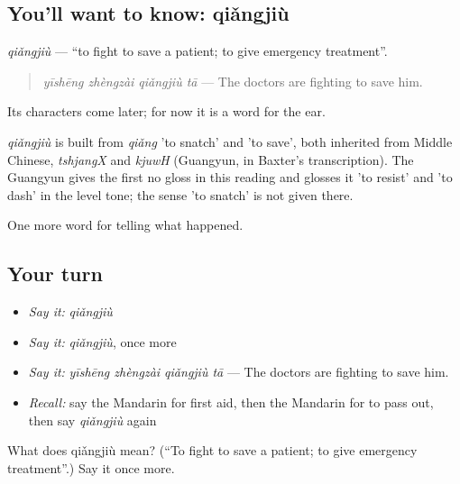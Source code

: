 \subsection*{You'll want to know: qiǎngjiù}
\emph{qiǎngjiù} — \textquotedblleft{}to fight to save a patient; to give emergency treatment\textquotedblright{}.

\begin{quote}
\emph{yīshēng zhèngzài qiǎngjiù tā} — The doctors are fighting to save him.
\end{quote}

Its characters come later; for now it is a word for the ear.

\begin{cousinweb}
\emph{qiǎngjiù} is built from \emph{qiǎng} 'to snatch' and  'to save', both inherited from Middle Chinese, \emph{tshjangX} and \emph{kjuwH} (Guangyun, in Baxter's transcription). The Guangyun gives the first no gloss in this reading and glosses it 'to resist' and 'to dash' in the level tone; the sense 'to snatch' is not given there.
\end{cousinweb}

\begin{grammarlens}[title={What you've built}]
One more word for telling what happened.
\end{grammarlens}

\subsection*{Your turn}
\begin{itemize}
\raggedright
  \item \emph{Say it:} \emph{qiǎngjiù}
  \item \emph{Say it:} \emph{qiǎngjiù}, once more
  \item \emph{Say it:} \emph{yīshēng zhèngzài qiǎngjiù tā} — The doctors are fighting to save him.
  \item \emph{Recall:} say the Mandarin for first aid, then the Mandarin for to pass out, then say \emph{qiǎngjiù} again
\end{itemize}

\begin{tcolorbox}[breakable,colback=teal!4,colframe=teal!35!black,title={Before you move on}]
What does qiǎngjiù mean? (\textquotedblleft{}To fight to save a patient; to give emergency treatment\textquotedblright{}.) Say it once more.
\end{tcolorbox}
